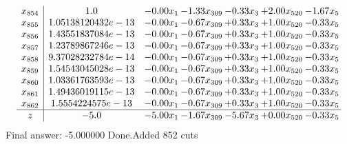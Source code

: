 \documentclass[8pt]{article}
\begin{document}
\[\begin{array}{c| c c@{\hskip 2pt} c@{\hskip 2pt} c@{\hskip 2pt} c@{\hskip 2pt} c@{\hskip 2pt} }
 x_{854}   &  1.0 & -0.00 x_{1} & -1.33 x_{309} & -0.33 x_{3} & +  2.00 x_{520} & -1.67 x_{5}\\
 x_{855}   &  1.05138120432e-13 & -0.00 x_{1} & -0.67 x_{309} & +  0.33 x_{3} & +  1.00 x_{520} & -0.33 x_{5}\\
 x_{856}   &  1.43551837084e-13 & -0.00 x_{1} & -0.67 x_{309} & +  0.33 x_{3} & +  1.00 x_{520} & -0.33 x_{5}\\
 x_{857}   &  1.23789867246e-13 & -0.00 x_{1} & -0.67 x_{309} & +  0.33 x_{3} & +  1.00 x_{520} & -0.33 x_{5}\\
 x_{858}   &  9.37028232784e-14 & -0.00 x_{1} & -0.67 x_{309} & +  0.33 x_{3} & +  1.00 x_{520} & -0.33 x_{5}\\
 x_{859}   &  1.54543045028e-13 & -0.00 x_{1} & -0.67 x_{309} & +  0.33 x_{3} & +  1.00 x_{520} & -0.33 x_{5}\\
 x_{860}   &  1.03361763593e-13 & -0.00 x_{1} & -0.67 x_{309} & +  0.33 x_{3} & +  1.00 x_{520} & -0.33 x_{5}\\
 x_{861}   &  1.49436019115e-13 & -0.00 x_{1} & -0.67 x_{309} & +  0.33 x_{3} & +  1.00 x_{520} & -0.33 x_{5}\\
 x_{862}   &  1.5554224575e-13 & -0.00 x_{1} & -0.67 x_{309} & +  0.33 x_{3} & +  1.00 x_{520} & -0.33 x_{5}\\
\hline
z    &  -5.0 & -5.00 x_{1} & -1.67 x_{309} & -5.67 x_{3} & +  0.00 x_{520} & -0.33 x_{5}\\
\end{array}\]
 Final answer: -5.000000 
Done.Added 852 cuts 
\end{document}
